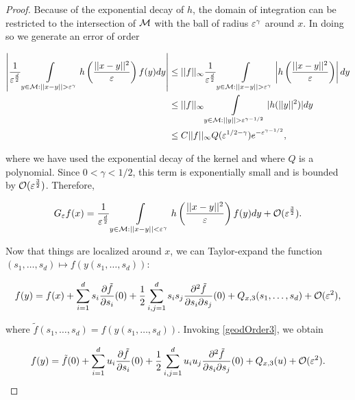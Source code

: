 \begin{proof}
Because of the exponential decay of $h$, the domain of integration can be restricted to the intersection of $\mathcal{M}$ with the ball of radius $\varepsilon^\gamma$ around $x$. In doing so we generate an error of order

\begin{equation*}\begin{align*}
\left|\frac{1}{\eps^\frac{d}{2}}\int\limits_{y\in\Man:||x-y||>\eps^\gamma} h\left(\frac{||x-y||^2}{\eps} \right)f(y)dy \right|&\leq
||f||_\infty \frac{1}{\eps^\frac{d}{2}}\int\limits_{y\in\Man:||x-y||>\eps^\gamma} \left|h\left(\frac{||x-y||^2}{\eps} \right)\right|dy \\
&\leq ||f||_\infty \int\limits_{y\in\Man:||y||>\eps^{\gamma-1/2}} |h(||y||^2)|dy \\
&\leq C||f||_\infty Q(\eps^{1/2-\gamma})e^{-\eps^{\gamma-1/2}},
\end{align*}\end{equation*}

where we have used the exponential decay of the kernel and where $Q$ is a polynomial. Since $0<\gamma<1/2$, this term is exponentially small and is bounded by $\mathcal{O}(\varepsilon^{\frac{3}{2}})$. Therefore,

\begin{equation*}
G_\varepsilon f(x)=\frac{1}{\varepsilon^\frac{d}{2}}\int\limits_{y\in\mathcal{M}:||x-y||<\varepsilon^\gamma} h\left(\frac{||x-y||^2}{\varepsilon} \right)f(y)dy+\mathcal{O}(\varepsilon^\frac{3}{2}).
\end{equation*}

Now that things are localized around $x$, we can Taylor-expand the function $(s_1,\dots,s_d)\mapsto f(y(s_1,\dots,s_d))$:

\begin{equation*}
f(y)=f(x)+\sum_{i=1}^d s_i \frac{\partial\tilde{f}}{\partial s_i}(0)+\frac{1}{2}\sum_{i,j=1}^d s_i s_j \frac{\partial^2\tilde{f}}{\partial s_i\partial s_j}(0)+Q_{x,3}(s_1,\dots,s_d)+\mathcal{O}(\varepsilon^2),
\end{equation*}

where $\tilde{f}(s_1,\dots,s_d)=f(y(s_1,\dots,s_d))$. Invoking \eqref{geodOrder3}, we obtain

\begin{equation*}
f(y)=\tilde{f}(0)+\sum_{i=1}^d u_i \frac{\partial \tilde{f}}{\partial s_i}(0)+\frac{1}{2}\sum_{i,j=1}^d u_i u_j \frac{\partial^2\tilde{f}}{\partial s_i\partial s_j}(0)+Q_{x,3}(u)+\mathcal{O}(\varepsilon^2).
\end{equation*}


\end{proof}
